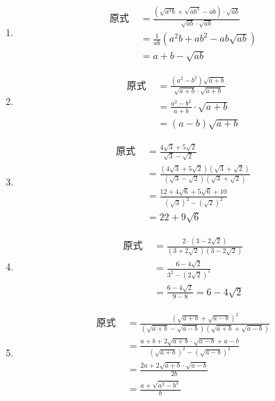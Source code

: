 \begin{solution}
\begin{enumerate}
    \item \[\begin{split}
\text{原式 }&=\frac{\left(\sqrt{a^{3} b}+\sqrt{a b^{3}}-a b\right) \cdot \sqrt{a b}}{\sqrt{a b} \cdot \sqrt{a b}}\\
&=\frac{1}{a b}\left(a^{2} b+a b^{2}-a b \sqrt{a b}\right)\\
&=a+b-\sqrt{ab}
    \end{split}\]
    \item \[\begin{split}
\text{原式 }&= \frac{(a^2-b^2)\sqrt{a+b}}{\sqrt{a+b}\cdot \sqrt{a+b}}   \\
&= \frac{a^2-b^2}{a+b}\cdot \sqrt{a+b}  \\
&=  (a-b)\sqrt{a+b}
    \end{split}\]
    \item \[\begin{split}
\text{原式 }&= \frac{4\sqrt{3}+5\sqrt{2}}{\sqrt{3}-\sqrt{2}}   \\
&= \frac{\left(4\sqrt{3}+5\sqrt{2}\right)\left(\sqrt{3}+\sqrt{2}\right)}{\left(\sqrt{3}-\sqrt{2}\right)\left(\sqrt{3}+\sqrt{2}\right)}  \\
&=  \frac{12+4\sqrt{6}+5\sqrt{6}+10}{(\sqrt{3})^2-(\sqrt{2})^2}\\
&=22+9\sqrt{6}
    \end{split}\]
        \item \[\begin{split}
\text{原式 }&= \frac{2\cdot (3-2\sqrt{2})}{(3+2\sqrt{2})(3-2\sqrt{2})}   \\
&= \frac{6-4\sqrt{2}}{3^2-(2\sqrt{2})^2}  \\
&=  \frac{6-4\sqrt{2}}{9-8}=6-4\sqrt{2}
    \end{split}\]
            \item \[\begin{split}
\text{原式 }&= \frac{(\sqrt{a+b}+\sqrt{a-b})^2}{(\sqrt{a+b}-\sqrt{a-b})(\sqrt{a+b}+\sqrt{a-b})}   \\
&= \frac{a+b+2\sqrt{a+b}\cdot \sqrt{a-b}+a-b}{(\sqrt{a+b})^2-(\sqrt{a-b})^2}  \\
&= \frac{2a+2\sqrt{a+b}\cdot \sqrt{a-b}}{2b}\\
&=\frac{a+\sqrt{a^2-b^2}}{b} 
    \end{split}\]
\end{enumerate}
\end{solution}

